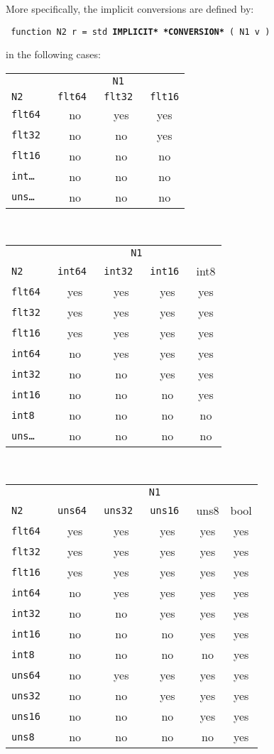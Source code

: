 \documentclass[12pt]{article}
\newcommand{\ttkey}[1]{{\tt \bfseries #1}}
\newenvironment{indpar}[1][0.3in]%
	{\begin{list}{}%
		     {\setlength{\itemsep}{0in}%
		      \setlength{\topsep}{0in}%
		      \setlength{\parsep}{1ex}%
		      \setlength{\labelwidth}{#1}%
		      \setlength{\leftmargin}{#1}%
		      \addtolength{\leftmargin}{\labelsep}}%
	 \item}%
	{\end{list}}
\begin{document}
More specifically,
the implicit conversions are defined by:
\begin{indpar} \tt
function N2 r = std \ttkey{*IMPLICIT* *CONVERSION*} ( N1 v )
\end{indpar}
in the following cases:
\begin{center}
\begin{tabular}{l|c|c|c|}
\multicolumn{1}{c}{}	& \multicolumn{3}{c}{\tt N1} \\
\tt N2  & \tt flt64 & \tt flt32 & \tt flt16
\\\hline
\tt flt64 & no & yes & yes \\
\tt flt32 & no & no & yes \\
\tt flt16 & no & no & no
\\\hline
\tt int\ldots{} & no & no & no \\
\tt uns\ldots{} & no & no & no
\\\hline
\end{tabular}
\\[2ex]
\begin{tabular}{l|c|c|c|c|}
\multicolumn{1}{c}{}	& \multicolumn{4}{c}{\tt N1} \\
\tt N2  & \tt int64 & \tt int32 & \tt int16 & int8
\\\hline
\tt flt64 & yes & yes & yes & yes \\
\tt flt32 & yes & yes & yes & yes \\
\tt flt16 & yes & yes & yes & yes
\\\hline
\tt int64 & no & yes & yes & yes \\
\tt int32 & no & no & yes & yes \\
\tt int16 & no & no & no & yes \\
\tt int8 & no & no & no & no
\\\hline
\tt uns\ldots{} & no & no & no & no
\\\hline
\end{tabular}
\\[2ex]
\begin{tabular}{l|c|c|c|c|c|}
\multicolumn{1}{c}{}	& \multicolumn{5}{c}{\tt N1} \\
\tt N2  & \tt uns64 & \tt uns32 & \tt uns16 & uns8 & bool
\\\hline
\tt flt64 & yes & yes & yes & yes & yes \\
\tt flt32 & yes & yes & yes & yes & yes \\
\tt flt16 & yes & yes & yes & yes & yes
\\\hline
\tt int64 & no & yes & yes & yes & yes \\
\tt int32 & no & no & yes & yes & yes \\
\tt int16 & no & no & no & yes & yes \\
\tt int8 & no & no & no & no & yes
\\\hline
\tt uns64 & no & yes & yes & yes & yes \\
\tt uns32 & no & no & yes & yes & yes \\
\tt uns16 & no & no & no & yes & yes \\
\tt uns8 & no & no & no & no & yes
\\\hline
\end{tabular}
\end{center}
\end{document}
